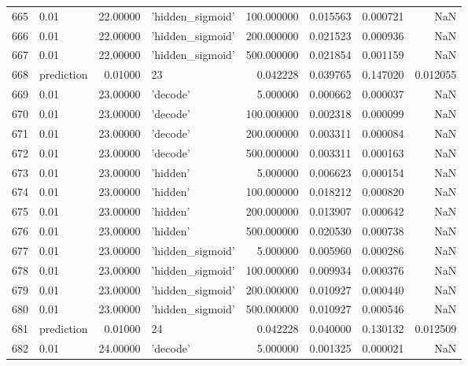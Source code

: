 \documentclass[10pt,a4paper]{article}
\begin{document}
\begin{tabular}{llrlrrrr}
665  &        0.01 &  22.00000 &   'hidden\_sigmoid' &  100.000000 &  0.015563 &  0.000721 &       NaN \\
666  &        0.01 &  22.00000 &   'hidden\_sigmoid' &  200.000000 &  0.021523 &  0.000936 &       NaN \\
667  &        0.01 &  22.00000 &   'hidden\_sigmoid' &  500.000000 &  0.021854 &  0.001159 &       NaN \\
668  &  prediction &   0.01000 &                 23 &    0.042228 &  0.039765 &  0.147020 &  0.012055 \\
669  &        0.01 &  23.00000 &           'decode' &    5.000000 &  0.000662 &  0.000037 &       NaN \\
670  &        0.01 &  23.00000 &           'decode' &  100.000000 &  0.002318 &  0.000099 &       NaN \\
671  &        0.01 &  23.00000 &           'decode' &  200.000000 &  0.003311 &  0.000084 &       NaN \\
672  &        0.01 &  23.00000 &           'decode' &  500.000000 &  0.003311 &  0.000163 &       NaN \\
673  &        0.01 &  23.00000 &           'hidden' &    5.000000 &  0.006623 &  0.000154 &       NaN \\
674  &        0.01 &  23.00000 &           'hidden' &  100.000000 &  0.018212 &  0.000820 &       NaN \\
675  &        0.01 &  23.00000 &           'hidden' &  200.000000 &  0.013907 &  0.000642 &       NaN \\
676  &        0.01 &  23.00000 &           'hidden' &  500.000000 &  0.020530 &  0.000738 &       NaN \\
677  &        0.01 &  23.00000 &   'hidden\_sigmoid' &    5.000000 &  0.005960 &  0.000286 &       NaN \\
678  &        0.01 &  23.00000 &   'hidden\_sigmoid' &  100.000000 &  0.009934 &  0.000376 &       NaN \\
679  &        0.01 &  23.00000 &   'hidden\_sigmoid' &  200.000000 &  0.010927 &  0.000440 &       NaN \\
680  &        0.01 &  23.00000 &   'hidden\_sigmoid' &  500.000000 &  0.010927 &  0.000546 &       NaN \\
681  &  prediction &   0.01000 &                 24 &    0.042228 &  0.040000 &  0.130132 &  0.012509 \\
682  &        0.01 &  24.00000 &           'decode' &    5.000000 &  0.001325 &  0.000021 &       NaN \\

\end{tabular}
\end{document}
